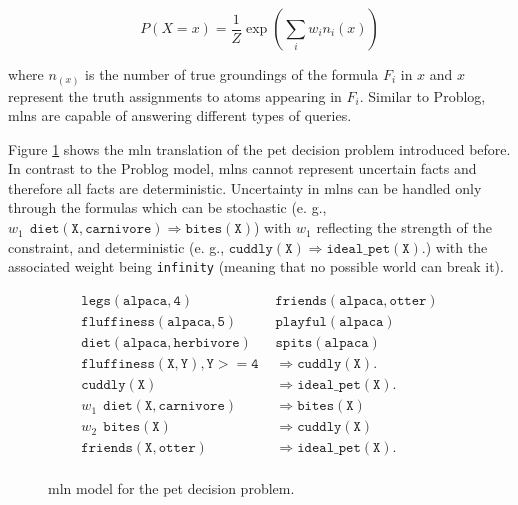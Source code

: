$$ P(X=x) = \frac{1}{Z} \exp \left(  \sum_{i}w_in_i(x) \right) $$

where $n_(x)$ is the number of true groundings of the formula $F_i$ in $x$ and $x$ represent the truth assignments to atoms appearing in $F_i$.
Similar to Problog, \gls{mln}s are capable of answering different types of queries.


Figure \ref{fig:mln} shows the \gls{mln} translation of the pet decision problem introduced before.
In contrast to the Problog model, \gls{mln}s cannot represent uncertain facts and therefore all facts are deterministic.
Uncertainty in \gls{mln}s can be handled only through the formulas which can be stochastic (e. g., $w_1 ~~ {\mathtt {diet(X,carnivore)}} \Rightarrow {\mathtt {bites(X)}} $) with $w_1$ reflecting the strength of the constraint, and deterministic (e. g., ${\mathtt {cuddly(X)}} \Rightarrow \mathtt {ideal\_pet(X)}.$) with the associated weight being \texttt{infinity} (meaning that no possible world can break it).






\begin{figure}
	$$\begin{aligned}
		{\mathtt {legs(alpaca,4)}} ~~~~&{\mathtt {friends(alpaca,otter)}} \nonumber \\
		{\mathtt {fluffiness(alpaca,5)}} ~~~~&{\mathtt {playful(alpaca)}} \nonumber \\
		{\mathtt {diet(alpaca,herbivore)}} ~~~~&{\mathtt {spits(alpaca)}} \nonumber \\
		{\mathtt {fluffiness(X,Y),Y >= 4}} &\Rightarrow  \mathtt {cuddly(X)}. \nonumber \\
		{\mathtt {cuddly(X)}} &\Rightarrow \mathtt {ideal\_pet(X)}. \nonumber \\
		w_1 ~~ {\mathtt {diet(X,carnivore)}} &\Rightarrow {\mathtt {bites(X)}} \nonumber \\
		w_2 ~~ {\mathtt {bites(X)}} &\Rightarrow {\mathtt {cuddly(X)}}  \nonumber \\
		{\mathtt {friends(X,otter)}} &\Rightarrow {\mathtt {ideal\_pet(X)}}. \nonumber \\
	\end{aligned}$$
	\caption[The \gls{mln} translation of the Problog program in Figure~\ref{fig:problog}]{\gls{mln} model for the pet decision problem. \label{fig:mln}}
\end{figure}










\cleardoublepage

